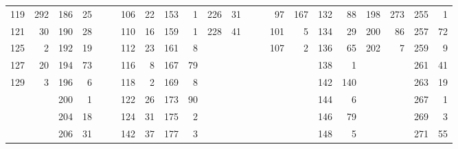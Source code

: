 \documentclass[a4paper,12pt]{article}
\begin{document}
\begin{landscape}
\begin{table}
\begin{tabular}{rrrrrrrrrrrrrrrrrrrrrr}
       119 &        292 &        186 &         25 &            &            &        106 &         22 &        153 &          1 &        226 &         31 &            &            &         97 &        167 &        132 &         88 &        198 &        273 &        255 &          1 \\

       121 &         30 &        190 &         28 &            &            &        110 &         16 &        159 &          1 &        228 &         41 &            &            &        101 &          5 &        134 &         29 &        200 &         86 &        257 &         72 \\

       125 &          2 &        192 &         19 &            &            &        112 &         23 &        161 &          8 &            &            &            &            &        107 &          2 &        136 &         65 &        202 &          7 &        259 &          9 \\

       127 &         20 &        194 &         73 &            &            &        116 &          8 &        167 &         79 &            &            &            &            &            &            &        138 &          1 &            &            &        261 &         41 \\

       129 &          3 &        196 &          6 &            &            &        118 &          2 &        169 &          8 &            &            &            &            &            &            &        142 &        140 &            &            &        263 &         19 \\

           &            &        200 &          1 &            &            &        122 &         26 &        173 &         90 &            &            &            &            &            &            &        144 &          6 &            &            &        267 &          1 \\

           &            &        204 &         18 &            &            &        124 &         31 &        175 &          2 &            &            &            &            &            &            &        146 &         79 &            &            &        269 &          3 \\

           &            &        206 &         31 &            &            &        142 &         37 &        177 &          3 &            &            &            &            &            &            &        148 &          5 &            &            &        271 &         55 \\


\end{tabular}
\end{table}
\end{landscape}
\end{document}
